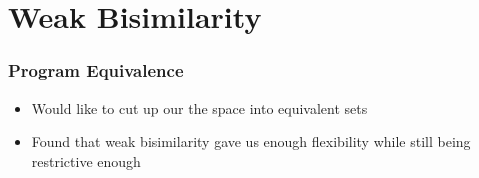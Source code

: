 \documentclass[compress]{beamer}
\begin{document}
\section{Weak Bisimilarity}
\begin{frame}
\frametitle{Program Equivalence}
\begin{itemize}
\item Would like to cut up our the space into equivalent sets
\item Found that weak bisimilarity gave us enough flexibility while still being restrictive enough
\end{itemize}
\end{frame}
\end{document}
